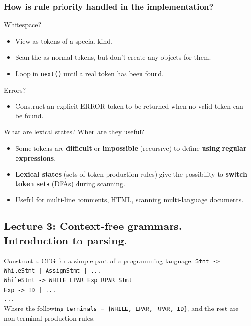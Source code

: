 \documentclass[11pt]{beamer}
\begin{document}
\begin{frame}
\frametitle{How is rule priority handled in the implementation?}

\begin{block}{Whitespace?}
\begin{itemize}
\item View as tokens of a special kind.
\item Scan the as normal tokens, but don't create any objects for them.
\item Loop in \texttt{next()} until a real token has been found.
\end{itemize}
\end{block}

\begin{block}{Errors?}
\begin{itemize}
\item Construct an explicit ERROR token to be returned when no valid token can be found.
\end{itemize}
\end{block}

\end{frame}

\begin{frame}

\begin{block}{What are lexical states? When are they useful?}
\begin{itemize}
\item Some tokens are \textbf{difficult} or \textbf{impossible} (recursive) to define \textbf{using regular expressions}.
\item \textbf{Lexical states} (sets of token production rules) give the possibility to \textbf{switch token sets} (DFAs) during scanning.
\item Useful for multi-line comments, HTML, scanning multi-language documents.
\end{itemize}
\end{block}


\end{frame}

\subsection{Lecture 3: Context-free grammars. Introduction to parsing.}
\begin{frame}

\begin{block}{Construct a CFG for a simple part of a programming language.	}
\texttt{Stmt -> WhileStmt | AssignStmt | ...}\\
\texttt{WhileStmt -> WHILE LPAR Exp RPAR Stmt}\\
\texttt{Exp -> ID | ...}\\
\texttt{...}\\
Where the following \texttt{terminals = \{WHILE, LPAR, RPAR, ID\}}, and the rest are non-terminal production rules.

\end{block}
\end{frame}
\end{document}
